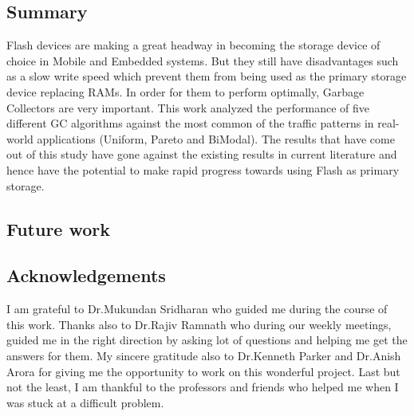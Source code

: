 \subsection*{Summary}
	Flash devices are making a great headway in becoming the storage device of choice in Mobile and Embedded systems. But they still have disadvantages such as a slow write speed which prevent them from being used as the primary storage device replacing RAMs. In order for them to perform optimally, Garbage Collectors are very important. This work analyzed the performance of five different GC algorithms against the most common of the traffic patterns in real-world applications (Uniform, Pareto and BiModal). The results that have come out of this study have gone against the existing results in current literature and hence have the potential to make rapid progress towards using Flash as primary storage. 

\subsection*{Future work}
	

\subsection*{Acknowledgements}
	I am grateful to Dr.Mukundan Sridharan who guided me during the course of this work. Thanks also to Dr.Rajiv Ramnath who during our weekly meetings, guided me in the right direction by asking lot of questions and helping me get the answers for them. My sincere gratitude also to Dr.Kenneth Parker and Dr.Anish Arora for giving me the opportunity to work on this wonderful project. Last but not the least, I am thankful to the professors and friends who helped me when I was stuck at a difficult problem. 